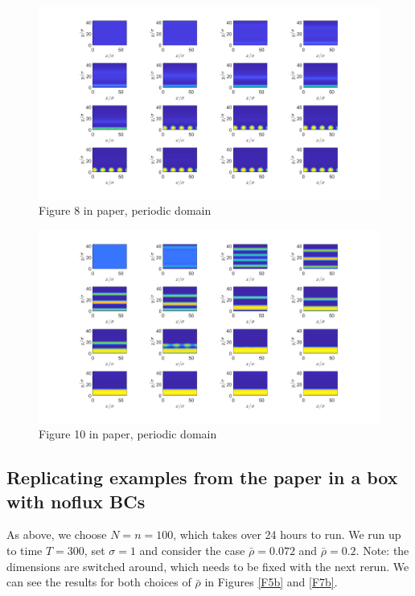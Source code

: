 \documentclass[11pt, a4paper]{article}
\theoremstyle{definition}
\begin{document}
\begin{figure}[h]
	\centering
	\includegraphics[scale=0.2]{Plotrhobar0072.png}
	\caption{Figure 8 in paper, periodic domain} 
	\label{F5}
\end{figure}
\begin{figure}[h]
	\centering
	\includegraphics[scale=0.2]{Plotrhobar02.png}
	\caption{Figure 10 in paper, periodic domain} 
	\label{F7}
\end{figure}



\subsection{Replicating examples from the paper in a box with noflux BCs}
As above, we choose $N = n = 100$, which takes over 24 hours to run. We run up to time $T = 300$, set $\sigma = 1$ and consider the case $\bar \rho = 0.072$ and $ \bar \rho = 0.2$. Note: the dimensions are switched around, which needs to be fixed with the next rerun. We can see the results for both choices of $\bar \rho$ in Figures \ref{F5b} and \ref{F7b}.
\end{document}
